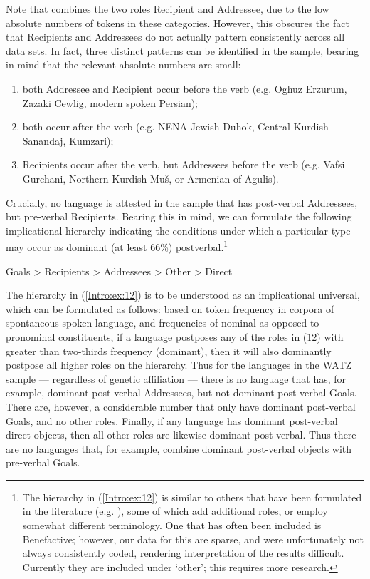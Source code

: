 \documentclass[output=paper,colorlinks,citecolor=brown,collectionchapter]{langscibook}
\begin{document}
Note that  combines the two roles Recipient and Addressee, due to the low absolute numbers of tokens in these categories. However, this obscures the fact that Recipients and Addressees do not actually pattern consistently across all data sets. In fact, three distinct patterns can be identified in the sample, bearing in mind that the relevant absolute numbers are small:
\begin{enumerate}[label=(\roman*)]
    \item both Addressee and Recipient occur before the verb (e.g. Oghuz Erzurum, Zazaki Cewlig, modern spoken Persian); 
    \item both occur after the verb (e.g. NENA Jewish Duhok, Central Kurdish Sanandaj, Kumzari); 
    \item Recipients occur after the verb, but Addressees before the verb (e.g. Vafsi Gurchani, Northern Kurdish Muš, or Armenian of Agulis). 
\end{enumerate}
Crucially, no language is attested in the sample that has post-verbal Addressees, but pre-verbal Recipients. Bearing this in mind, we can formulate the following implicational hierarchy indicating the conditions under which a particular  type may occur as dominant (at least 66\%) postverbal.\footnote{The hierarchy in (\ref{Intro:ex:12}) is similar to others that have been formulated in the literature (e.g. \citealt{frommer_post-verbal_1981,haig_introduction_2018,stilo_preverbal_2018}), some of which add additional roles, or employ somewhat different terminology. One  that has often been included is Benefactive; however, our data for this  are sparse, and were unfortunately not always consistently coded,  rendering interpretation of the results difficult. Currently they are included under `other'; this requires more research.}

\ea\label{Intro:ex:12} 
Goals > Recipients > Addressees > Other > Direct 
\z

The hierarchy in (\ref{Intro:ex:12}) is to be understood as an implicational universal, which can be formulated as follows: based on token frequency in corpora of spontaneous spoken language, and frequencies of nominal as opposed to pronominal constituents,  if a language postposes any of the roles in (12) with greater than two-thirds frequency (dominant), then it will also dominantly postpose all higher roles on the hierarchy. Thus for the languages in the WATZ sample --- regardless of genetic affiliation --- there is no language that has, for example, dominant post-verbal Addressees, but not dominant post-verbal Goals. There are, however, a considerable number that only have dominant post-verbal Goals, and no other roles. Finally, if any language has dominant post-verbal direct objects, then all other roles are likewise dominant post-verbal. Thus there are no languages that, for example, combine dominant post-verbal objects with pre-verbal Goals.
\end{document}
